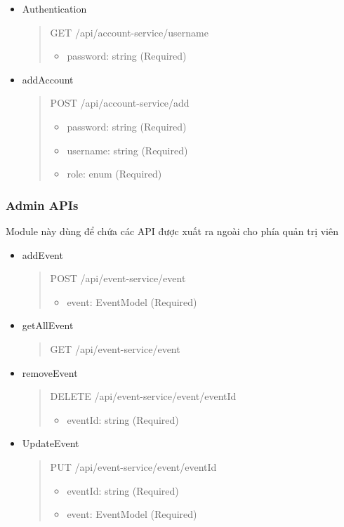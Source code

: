 \begin{itemize}
	\item Authentication
	\begin{quote}
		GET /api/account-service/{username}
		\begin{itemize}
			\item password: string (Required)
			\end{itemize}
	\end{quote}

	\item addAccount
	\begin{quote}
		POST /api/account-service/add
		\begin{itemize}
			\item password: string (Required)
			\item username: string (Required)
			\item role: enum (Required)
		\end{itemize}
	\end{quote}
\end{itemize}





\subsubsection{Admin APIs}
Module này dùng để chứa các API được xuất ra ngoài cho phía quản trị viên

\begin{itemize}
	\item addEvent
	\begin{quote}
		POST /api/event-service/event
		\begin{itemize}
			\item event: EventModel (Required)
		\end{itemize}
	\end{quote}

	\item getAllEvent
	\begin{quote}
		GET /api/event-service/event
	\end{quote}

	\item removeEvent
	\begin{quote}
		DELETE /api/event-service/event/{eventId}
		\begin{itemize}
			\item eventId: string (Required)
		\end{itemize}
	\end{quote}

	\item UpdateEvent
	\begin{quote}
		PUT /api/event-service/event/{eventId}
		\begin{itemize}
			\item eventId: string (Required)
			\item event: EventModel (Required)
		\end{itemize}
	\end{quote}
\end{itemize}

